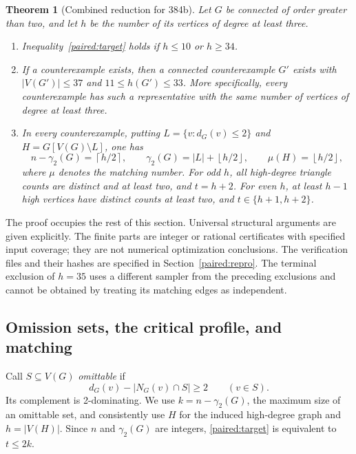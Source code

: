 \documentclass[11pt,a4paper]{article}
\newtheorem{theorem}{Theorem}[section]
\theoremstyle{definition}\newtheorem{definition}[theorem]{Definition}
\theoremstyle{remark}\newtheorem{remark}[theorem]{Remark}
\newcommand{\ceil}[1]{\left\lceil#1\right\rceil}
\newcommand{\floor}[1]{\left\lfloor#1\right\rfloor}
\begin{document}
\begin{theorem}[Combined reduction for 384b]\label{paired:terminal}
Let $G$ be connected of order greater than two, and let $h$ be the
number of its vertices of degree at least three.
\begin{enumerate}
 \item Inequality~\eqref{paired:target} holds if $h\le10$ or $h\ge34$.
 \item If a counterexample exists, then a connected counterexample
 $G'$ exists with $|V(G')|\le37$ and $11\le h(G')\le33$.
 More specifically, every counterexample has such a representative
 with the same number of vertices of degree at least three.
 \item In every counterexample, putting $L=\{v:d_G(v)\le2\}$ and
 $H=G[V(G)\setminus L]$, one has
 \[
 n-\gamma_2(G)=\ceil{h/2},\qquad
 \gamma_2(G)=|L|+\floor{h/2},\qquad
 \mu(H)=\floor{h/2},
 \]
 where $\mu$ denotes the matching number. For odd $h$, all high-degree
 triangle counts are distinct and at least two, and $t=h+2$.
 For even $h$, at least $h-1$ high vertices have distinct counts at
 least two, and $t\in\{h+1,h+2\}$.
\end{enumerate}
\end{theorem}

The proof occupies the rest of this section. Universal structural
arguments are given explicitly. The finite parts are integer or rational
certificates with specified input coverage; they are not numerical
optimization conclusions. The verification files and their hashes are
specified in Section~\ref{paired:repro}. The terminal exclusion of $h=35$
uses a different sampler from the preceding exclusions and cannot be
obtained by treating its matching edges as independent.

\subsection{Omission sets, the critical profile, and matching}
\label{paired:critical-section}

Call $S\subseteq V(G)$ \emph{omittable} if
\begin{equation}\label{paired:omission}
 d_G(v)-|N_G(v)\cap S|\ge2\qquad(v\in S).
\end{equation}
Its complement is 2-dominating. We use
$k=n-\gamma_2(G)$, the maximum size of an omittable set, and consistently
use $H$ for the induced high-degree graph and $h=|V(H)|$.
Since $n$ and $\gamma_2(G)$ are integers,
\eqref{paired:target} is equivalent to $t\le2k$.
\end{document}

